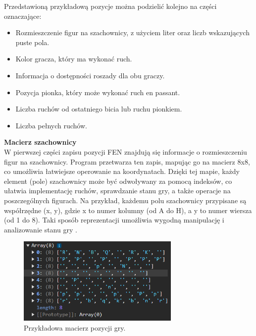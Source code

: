\documentclass[twoside]{projektInzynierskiMS1}
\begin{document}
\newpage

\noindent
Przedstawioną przykładową pozycje można podzielić kolejno na części oznaczające:

\begin{itemize}
    \item Rozmieszczenie figur na szachownicy, z użyciem liter oraz liczb wskazujących puste pola.
    \item Kolor gracza, który ma wykonać ruch.
    \item Informacja o dostępności roszady dla obu graczy.
    \item Pozycja pionka, który może wykonać ruch en passant.
    \item Liczba ruchów od ostatniego bicia lub ruchu pionkiem.
    \item Liczba pełnych ruchów.
\end{itemize}

\noindent \textbf{Macierz szachownicy}\\
W pierwszej części zapisu pozycji FEN znajdują się informacje o rozmieszczeniu figur na szachownicy. Program przetwarza ten zapis, mapując go na macierz 8x8, co umożliwia łatwiejsze operowanie na koordynatach. Dzięki tej mapie, każdy element (pole) szachownicy może być odwoływany za pomocą indeksów, co ułatwia implementację ruchów, sprawdzanie stanu gry, a także operacje na poszczególnych figurach. Na przykład, każdemu polu szachownicy przypisane są współrzędne (x, y), gdzie x to numer kolumny (od A do H), a y to numer wiersza (od 1 do 8). Taki sposób reprezentacji umożliwia wygodną manipulację i analizowanie stanu gry \cite{WikiNotacjaForsytha}.

\vspace{0.5cm}
\begin{figure}[h!]
    \centering
    \includegraphics[width=0.7\textwidth]{images/ex_matrix.png}
    \caption{Przykładowa macierz pozycji gry.}
\end{figure}

\newpage
\end{document}
